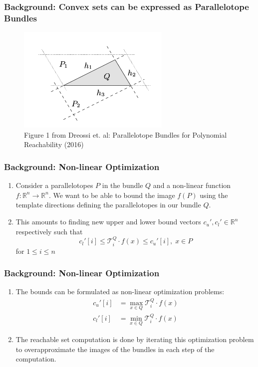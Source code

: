 \documentclass{beamer}
\begin{document}
\begin{frame}
  \frametitle{\textbf{Background:} Convex sets can be expressed as Parallelotope Bundles}

  \begin{figure}
    \centering
    \includegraphics[width=0.65\textwidth]{ptopedecomp}
    \caption{Figure 1 from Dreossi et. al: Parallelotope Bundles for Polynomial Reachability (2016)}
  \end{figure}
\end{frame}

\begin{frame}
  \frametitle{\textbf{Background:} Non-linear Optimization}
  \begin{enumerate}
    \item Consider a parallelotopes $P$ in the bundle $Q$ and a non-linear function $f: \mathbb{R}^n \rightarrow \mathbb{R}^n$. We want to be able to bound the image $f(P)$ using the template directions defining the parallelotopes in our bundle $Q$.

    \item This amounts to finding new upper and lower bound vectors $c_{u}', c_{l}' \in \mathbb{R}^n$ respectively such that
    \[c_{l}'[i] \leq \mathcal{T}^Q_{i}\cdot f(x) \leq c_{u}'[i], \; x \in P \]
    for $1 \leq i \leq n$
  \end{enumerate}
\end{frame}

\begin{frame}
  \frametitle{\textbf{Background:} Non-linear Optimization}
  \begin{enumerate}
    \item The bounds can be formulated as non-linear optimization problems:
   \begin{align*}
     c_{u}'[i] & = \max_{x \in Q} \mathcal{T}^Q_i\cdot f(x) \\
     c_{l}'[i] & = \min_{x \in Q} \mathcal{T}^Q_i\cdot f(x)
   \end{align*}
     \item The reachable set computation is done by iterating this optimization problem to overapproximate the images of the bundles in each step of the computation.
  \end{enumerate}
\end{frame}
\end{document}
